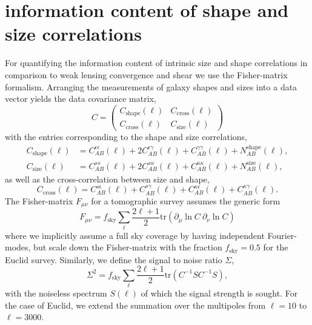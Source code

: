\documentclass[a4paper,fleqn,usenatbib]{mnras}
\begin{document}
\section{information content of shape and size correlations}\label{sect_fisher}
For quantifying the information content of intrinsic size and shape correlations in comparison to weak lensing convergence and shear we use the Fisher-matrix formalism. Arranging the measurements of galaxy shapes and sizes into a data vector yields the data covariance matrix,
\begin{equation}
C =
\left(
\begin{array}{cc}
C_\mathrm{shape}(\ell) & C_\mathrm{cross}(\ell) \\
C_\mathrm{cross}(\ell) & C_\mathrm{size}(\ell)
\end{array}
\right)
\end{equation}
with the entries corresponding to the shape and size correlations,
\begin{align}
C_\mathrm{shape}(\ell) & = C^{\epsilon\epsilon}_{AB}(\ell) + 2C^{\epsilon\gamma}_{AB}(\ell) + C^{\gamma\gamma}_{AB}(\ell) + N^\mathrm{shape}_{AB}(\ell),\\
C_\mathrm{size}(\ell) & = C^{ss}_{AB}(\ell) + 2C^{s\kappa}_{AB}(\ell) + C^{\kappa\kappa}_{AB}(\ell) + N^\mathrm{size}_{AB}(\ell),
\end{align}
as well as the cross-correlation between size and shape,
\begin{equation}
C_\mathrm{cross}(\ell) = C^{s\epsilon}_{AB}(\ell) + C^{s\gamma}_{AB}(\ell) + C^{\kappa\epsilon}_{AB}(\ell) + C^{\kappa\gamma}_{AB}(\ell).
\end{equation}
The Fisher-matrix $F_{\mu\nu}$ for a tomographic survey assumes the generic form
\begin{equation}
F_{\mu\nu} = f_\mathrm{sky}\sum_\ell\frac{2\ell+1}{2}\mathrm{tr}\left(\partial_\mu\ln C\:\partial_\nu\ln C\right)
\end{equation}
where we implicitly assume a full sky coverage by having independent Fourier-modes, but scale down the Fisher-matrix with the fraction $f_\mathrm{sky} = 0.5$ for the Euclid survey. Similarly, we define the signal to noise ratio $\Sigma$,
\begin{equation}
\Sigma^2 = f_\mathrm{sky}\sum_\ell\frac{2\ell+1}{2}\mathrm{tr}\left(C^{-1}SC^{-1}S\right),
\end{equation}
with the noiseless spectrum $S(\ell)$ of which the signal strength is sought. For the case of Euclid, we extend the summation over the multipoles from $\ell=10$ to $\ell=3000$.
\end{document}
